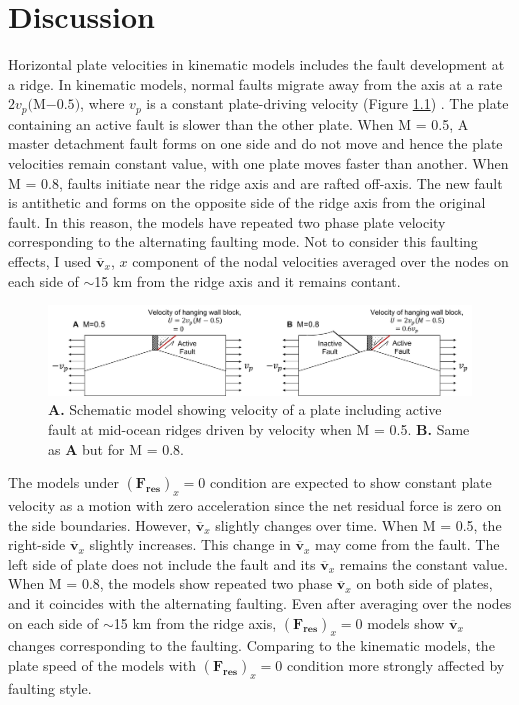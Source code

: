 \documentclass[letterpaper,12pt,notitle]{memphisthesis}                     %
\begin{document}
\chapter{Discussion}

 Horizontal plate velocities in kinematic models includes the fault development at a ridge. In kinematic models, normal faults migrate away from the axis at a rate $2v_p($M$-0.5)$, where $v_p$ is a constant plate-driving velocity (Figure \ref{fig:hangingwall}) \citep{Buck2005}. The plate containing an active fault is slower than the other plate. When M = 0.5, A master detachment fault forms on one side and do not move and hence the plate velocities remain constant value, with one plate moves faster than another. When M = 0.8, faults initiate near the ridge axis and are rafted off-axis. The new fault is antithetic and forms on the opposite side of the ridge axis from the original fault. In this reason, the models have repeated two phase plate velocity corresponding to the alternating faulting mode. Not to consider this faulting effects, I used $\overline{\boldsymbol{v}}_{x}$, $x$ component of the nodal velocities averaged over the nodes on each side of $\sim$15 km from the ridge axis and it remains contant.

\begin{figure}[!htb]
	\centering
	\includegraphics[width=0.99\linewidth]{./figs/hangingwall.pdf}
	\caption{\textbf{A.} Schematic model showing velocity of a plate including active fault at mid-ocean ridges driven by velocity when M = 0.5. \textbf{B.} Same as \textbf{A} but for M = 0.8.}
	\label{fig:hangingwall}
\end{figure}

The models under $(\boldsymbol{F_{res}})_x=0$ condition are expected to show constant plate velocity as a motion with zero acceleration since the net residual force is zero on the side boundaries. However, $\overline{\boldsymbol{v}}_{x}$ slightly changes over time. When M = 0.5, the right-side $\overline{\boldsymbol{v}}_{x}$ slightly increases. This change in $\overline{\boldsymbol{v}}_{x}$ may come from the fault. The left side of plate does not include the fault and its $\overline{\boldsymbol{v}}_{x}$ remains the constant value. When M = 0.8, the models show repeated two phase $\overline{\boldsymbol{v}}_{x}$ on both side of plates, and it coincides with the alternating faulting. 
Even after averaging over the nodes on each side of $\sim$15 km from the ridge axis, $(\boldsymbol{F_{res}})_x=0$ models show $\overline{\boldsymbol{v}}_{x}$ changes corresponding to the faulting. Comparing to the kinematic models, the plate speed of the models with $(\boldsymbol{F_{res}})_x=0$ condition more strongly affected by faulting style.
\end{document}
